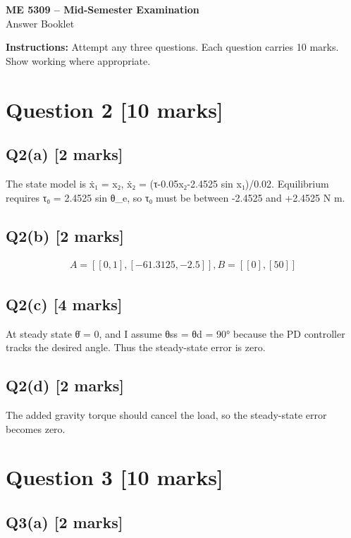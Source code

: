 \documentclass[11pt,a4paper]{article}
\begin{document}
\begin{center}
{\Large\bfseries ME 5309 -- Mid-Semester Examination}\\[3pt]
{\large Answer Booklet}\\[8pt]
\end{center}
\textbf{Instructions:} Attempt any three questions. Each question carries 10 marks. Show working where appropriate.
\section*{Question 2 \hfill [10 marks]}
\subsection*{Q2(a) \hfill [2 marks]}

The state model is ẋ₁ = x₂, ẋ₂ = (τ-0.05x₂-2.4525 sin x₁)/0.02.
Equilibrium requires τ₀ = 2.4525 sin θ\_e, so τ₀ must be between -2.4525 and +2.4525 N m.

\subsection*{Q2(b) \hfill [2 marks]}

\[\begin{aligned}A = [[0,1], [-61.3125,-2.5]], B = [[0],[50]]\end{aligned}\]

\subsection*{Q2(c) \hfill [4 marks]}

At steady state θ̇ = 0, and I assume θss = θd = 90° because the PD controller tracks the desired angle.
Thus the steady-state error is zero.

\subsection*{Q2(d) \hfill [2 marks]}

The added gravity torque should cancel the load, so the steady-state error becomes zero. 
\section*{Question 3 \hfill [10 marks]}
\subsection*{Q3(a) \hfill [2 marks]}
\end{document}
